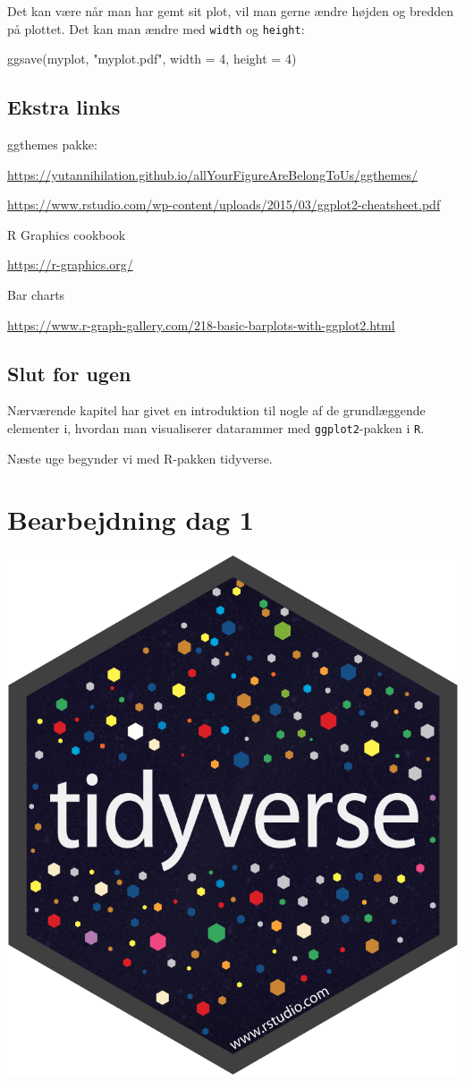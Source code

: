 \documentclass[
]{book}
\newenvironment{Shaded}{\begin{snugshade}}{\end{snugshade}}
\newcommand{\AttributeTok}[1]{\textcolor[rgb]{0.77,0.63,0.00}{#1}}
\newcommand{\DecValTok}[1]{\textcolor[rgb]{0.00,0.00,0.81}{#1}}
\newcommand{\FunctionTok}[1]{\textcolor[rgb]{0.00,0.00,0.00}{#1}}
\newcommand{\NormalTok}[1]{#1}
\newcommand{\StringTok}[1]{\textcolor[rgb]{0.31,0.60,0.02}{#1}}
\begin{document}
Det kan være når man har gemt sit plot, vil man gerne ændre højden og bredden på plottet. Det kan man ændre med \texttt{width} og \texttt{height}:

\begin{Shaded}
\begin{Highlighting}[]
\FunctionTok{ggsave}\NormalTok{(myplot, }\StringTok{"myplot.pdf"}\NormalTok{, }\AttributeTok{width =} \DecValTok{4}\NormalTok{, }\AttributeTok{height =} \DecValTok{4}\NormalTok{)}
\end{Highlighting}
\end{Shaded}

\hypertarget{ekstra-links-1}{%
\section{Ekstra links}\label{ekstra-links-1}}

ggthemes pakke:

\url{https://yutannihilation.github.io/allYourFigureAreBelongToUs/ggthemes/}

\url{https://www.rstudio.com/wp-content/uploads/2015/03/ggplot2-cheatsheet.pdf}

R Graphics cookbook

\url{https://r-graphics.org/}

Bar charts

\url{https://www.r-graph-gallery.com/218-basic-barplots-with-ggplot2.html}

\hypertarget{slut-for-ugen-1}{%
\section{Slut for ugen}\label{slut-for-ugen-1}}

Nærværende kapitel har givet en introduktion til nogle af de grundlæggende elementer i, hvordan man visualiserer datarammer med \texttt{ggplot2}-pakken i \texttt{R}.

Næste uge begynder vi med R-pakken tidyverse.

\hypertarget{data}{%
\chapter{Bearbejdning dag 1}\label{data}}

\includegraphics[width=0.15\linewidth]{plots/hex-tidyverse}
\end{document}
